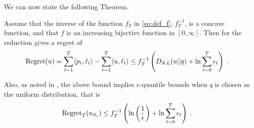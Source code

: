 We can now state the following Theorem.
\begin{theorem}
\label{theo:expert_reduction}
Assume that the inverse of the function $f_T$ in \eqref{eq:def_f}, $f_T^{-1}$, is a concave function, and that $f$ is an increasing bijective function in $[0,\infty]$.
Then for the reduction gives a regret of 
\[
\operatorname{Regret}(u) = \sum_{t=1}^T \langle p_t, \ell_t \rangle - \sum_{t=1}^T \langle u, \ell_t \rangle \leq f_T^{-1}\left(D_{KL}(u||q) + \ln \sum_{t=0}^T \epsilon_t\right) \;.
\]
\end{theorem}

Also, as noted in \citet{LuoS15}, the above bound implies $\epsilon$-quantile bounds when $q$ is chosen as the uniform distribution, that is
\[
\operatorname{Regret}_T(u_{S_\epsilon}) \leq f_T^{-1}\left(\ln\left(\frac{1}{\epsilon}\right) + \ln \sum_{t=0}^T \epsilon_t\right) \; .
\]